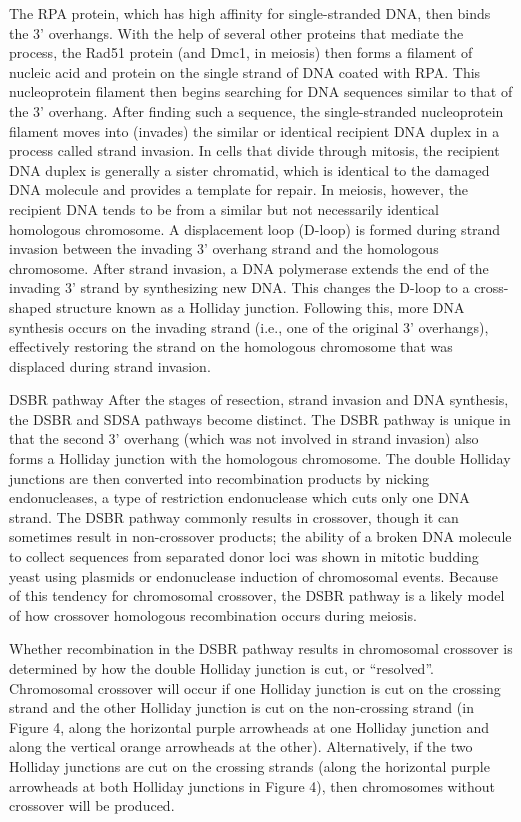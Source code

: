The RPA protein, which has high affinity for single-stranded DNA, then binds the 3' overhangs. With the help of several other proteins that mediate the process, the Rad51 protein (and Dmc1, in meiosis) then forms a filament of nucleic acid and protein on the single strand of DNA coated with RPA. This nucleoprotein filament then begins searching for DNA sequences similar to that of the 3' overhang. After finding such a sequence, the single-stranded nucleoprotein filament moves into (invades) the similar or identical recipient DNA duplex in a process called strand invasion. In cells that divide through mitosis, the recipient DNA duplex is generally a sister chromatid, which is identical to the damaged DNA molecule and provides a template for repair. In meiosis, however, the recipient DNA tends to be from a similar but not necessarily identical homologous chromosome. A displacement loop (D-loop) is formed during strand invasion between the invading 3' overhang strand and the homologous chromosome. After strand invasion, a DNA polymerase extends the end of the invading 3' strand by synthesizing new DNA. This changes the D-loop to a cross-shaped structure known as a Holliday junction. Following this, more DNA synthesis occurs on the invading strand (i.e., one of the original 3' overhangs), effectively restoring the strand on the homologous chromosome that was displaced during strand invasion.

DSBR pathway
After the stages of resection, strand invasion and DNA synthesis, the DSBR and SDSA pathways become distinct. The DSBR pathway is unique in that the second 3' overhang (which was not involved in strand invasion) also forms a Holliday junction with the homologous chromosome. The double Holliday junctions are then converted into recombination products by nicking endonucleases, a type of restriction endonuclease which cuts only one DNA strand. The DSBR pathway commonly results in crossover, though it can sometimes result in non-crossover products; the ability of a broken DNA molecule to collect sequences from separated donor loci was shown in mitotic budding yeast using plasmids or endonuclease induction of chromosomal events. Because of this tendency for chromosomal crossover, the DSBR pathway is a likely model of how crossover homologous recombination occurs during meiosis.

Whether recombination in the DSBR pathway results in chromosomal crossover is determined by how the double Holliday junction is cut, or ``resolved''. Chromosomal crossover will occur if one Holliday junction is cut on the crossing strand and the other Holliday junction is cut on the non-crossing strand (in Figure 4, along the horizontal purple arrowheads at one Holliday junction and along the vertical orange arrowheads at the other). Alternatively, if the two Holliday junctions are cut on the crossing strands (along the horizontal purple arrowheads at both Holliday junctions in Figure 4), then chromosomes without crossover will be produced.

